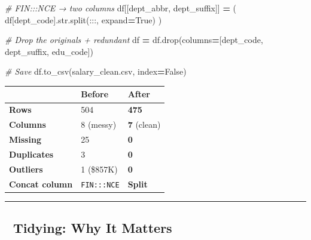 \documentclass[
]{article}
\newenvironment{Shaded}{\begin{snugshade}}{\end{snugshade}}
\newcommand{\BuiltInTok}[1]{#1}
\newcommand{\CommentTok}[1]{\textcolor[rgb]{0.56,0.35,0.01}{\textit{#1}}}
\newcommand{\NormalTok}[1]{#1}
\newcommand{\OperatorTok}[1]{\textcolor[rgb]{0.81,0.36,0.00}{\textbf{#1}}}
\newcommand{\StringTok}[1]{\textcolor[rgb]{0.31,0.60,0.02}{#1}}
\newcommand{\VariableTok}[1]{\textcolor[rgb]{0.00,0.00,0.00}{#1}}
\begin{document}
\begin{Shaded}
\begin{Highlighting}[]
\CommentTok{\# \textquotesingle{}FIN:::NCE\textquotesingle{} → two columns}
\NormalTok{df[[}\StringTok{\textquotesingle{}dept\_abbr\textquotesingle{}}\NormalTok{, }\StringTok{\textquotesingle{}dept\_suffix\textquotesingle{}}\NormalTok{]] }\OperatorTok{=}\NormalTok{ (}
\NormalTok{    df[}\StringTok{\textquotesingle{}dept\_code\textquotesingle{}}\NormalTok{].}\BuiltInTok{str}\NormalTok{.split(}\StringTok{\textquotesingle{}:::\textquotesingle{}}\NormalTok{, expand}\OperatorTok{=}\VariableTok{True}\NormalTok{)}
\NormalTok{)}

\CommentTok{\# Drop the originals + redundant}
\NormalTok{df }\OperatorTok{=}\NormalTok{ df.drop(columns}\OperatorTok{=}\NormalTok{[}\StringTok{\textquotesingle{}dept\_code\textquotesingle{}}\NormalTok{, }\StringTok{\textquotesingle{}dept\_suffix\textquotesingle{}}\NormalTok{, }\StringTok{\textquotesingle{}edu\_code\textquotesingle{}}\NormalTok{])}

\CommentTok{\# Save}
\NormalTok{df.to\_csv(}\StringTok{\textquotesingle{}salary\_clean.csv\textquotesingle{}}\NormalTok{, index}\OperatorTok{=}\VariableTok{False}\NormalTok{)}
\end{Highlighting}
\end{Shaded}

\begin{longtable}[]{@{}lll@{}}
\toprule\noalign{}
& Before & After \\
\midrule\noalign{}
\endhead
\bottomrule\noalign{}
\endlastfoot
\textbf{Rows} & 504 & \textbf{475} \\
\textbf{Columns} & 8 (messy) & \textbf{7} (clean) \\
\textbf{Missing} & 25 & \textbf{0} \\
\textbf{Duplicates} & 3 & \textbf{0} \\
\textbf{Outliers} & 1 (\$857K) & \textbf{0} \\
\textbf{Concat column} & \texttt{FIN:::NCE} & \textbf{Split} \\
\end{longtable}

\begin{center}\rule{0.5\linewidth}{0.5pt}\end{center}

\subsection{🧹 Tidying: Why It Matters}\label{tidying-why-it-matters}
\end{document}
